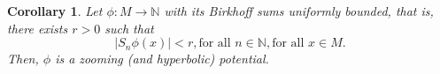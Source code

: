 \documentclass[12pt,a4paper]{amsart}
\theoremstyle{plain}
\newtheorem{remark}{Remark}[subsection]
\newtheorem{corollary}{Corollary}[subsection]
\begin{document}
%

\begin{corollary}\label{BIR}
	Let $\phi: M \to \mathbb{N}$ with its Birkhoff sums uniformly bounded, that is, there exists $r > 0$ such that
	\[
	|S_{n}\phi(x)| < r, \text{for all} \, \, n \in \mathbb{N}, \text{for all} \, \, x \in M.
	\]
	Then, $\phi$ is a zooming (and hyperbolic) potential.
\end{corollary}
%
\end{document}

